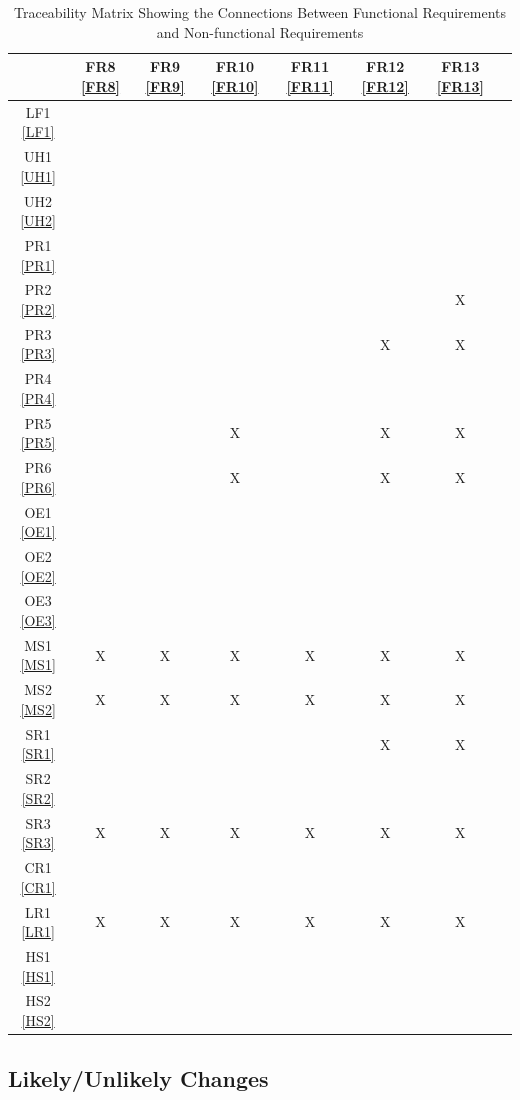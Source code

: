 \documentclass[12pt]{article}
\begin{document}
\begin{table}[h!]
    \centering
    \begin{tabular}{|c|c|c|c|c|c|c|c|}
    \hline
        & FR8 \ref{FR8} & FR9 \ref{FR9}& FR10 \ref{FR10}& FR11 \ref{FR11}& FR12 \ref{FR12}& FR13 \ref{FR13}\\
    \hline
    LF1 \ref{LF1}& & & & & &    \\ \hline
    UH1 \ref{UH1}& & & & & &    \\ \hline
    UH2 \ref{UH2}& & & & & &    \\ \hline
    PR1 \ref{PR1}& & & & & &    \\ \hline
    PR2 \ref{PR2}& & & & & & X   \\ \hline
    PR3 \ref{PR3}& & & & & X & X    \\ \hline
    PR4 \ref{PR4}& & & & & &    \\ \hline
    PR5 \ref{PR5}& & & X & & X & X    \\ \hline
    PR6 \ref{PR6}& & & X & & X & X    \\ \hline
    OE1 \ref{OE1}& & & & & &    \\ \hline
    OE2 \ref{OE2}& & & & & &    \\ \hline
    OE3 \ref{OE3}& & & & & &    \\ \hline
    MS1 \ref{MS1}& X & X & X & X & X & X  \\ \hline
    MS2 \ref{MS2}& X & X & X & X & X & X  \\ \hline
    SR1 \ref{SR1}& & & & & X & X   \\ \hline
    SR2 \ref{SR2}& & & & & &    \\ \hline
    SR3 \ref{SR3}& X & X & X & X & X & X  \\ \hline
    CR1 \ref{CR1}& & & & & &    \\ \hline
    LR1 \ref{LR1} & X & X & X & X & X & X  \\ \hline
    HS1 \ref{HS1}& & & & & &    \\ \hline
    HS2 \ref{HS2}& & & & & &    \\ \hline
    \end{tabular}
    \caption{Traceability Matrix Showing the Connections Between Functional Requirements and Non-functional Requirements} \label{TblTrace_2}
\end{table}

\newpage
\subsection{Likely/Unlikely Changes}
\end{document}
